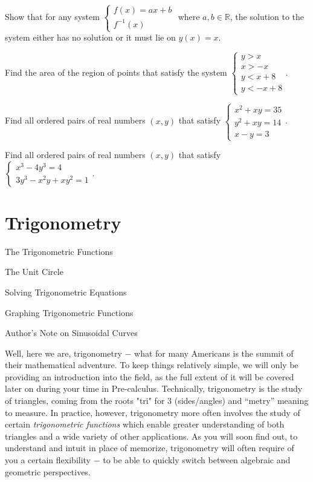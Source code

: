 \documentclass[lang=en,11pt]{elegantbook}
\begin{document}
\begin{challengeset}
\item Show that for any system $\begin{cases} f(x)=ax+b \\ f^{-1}(x) \end{cases}$ where $a,b\in\mathbb{R}$, the solution to the system either has no solution or it must lie on $y(x)=x$.
\item Find the area of the region of points that satisfy the system $\begin{cases} y>x \\ x>-x \\ y<x+8 \\ y<-x+8 \end{cases}$.
\item Find all ordered pairs of real numbers $(x,y)$ that satisfy $\begin{cases} x^2+xy=35 \\ y^2+xy=14 \\ x-y=3 \end{cases}$.
\item Find all ordered pairs of real numbers $(x,y)$ that satisfy $\begin{cases} x^3-4y^3=4 \\ 3y^3-x^2y+xy^2=1 \end{cases}$.
\end{challengeset}
\chapter{Trigonometry}
\begin{introduction}[Contents]
\item The Trigonometric Functions
\item The Unit Circle
\item Solving Trigonometric Equations
\item Graphing Trigonometric Functions
\item Author's Note on Sinusoidal Curves
\end{introduction}
\noindent Well, here we are, trigonometry $-$ what for many Americans is the summit of their mathematical adventure. To keep things relatively simple, we will only be providing an introduction into the field, as the full extent of it will be covered later on during your time in Pre-calculus. Technically, trigonometry is the study of triangles, coming from the roots "tri" for $3$ (sides/angles) and “metry” meaning to measure. In practice, however, trigonometry more often involves the study of certain \textit{trigonometric functions} which enable greater understanding of both triangles and a wide variety of other applications. As you will soon find out, to understand and intuit in place of memorize, trigonometry will often require of you a certain flexibility $-$ to be able to quickly switch between algebraic and geometric perspectives.  
\end{document}
